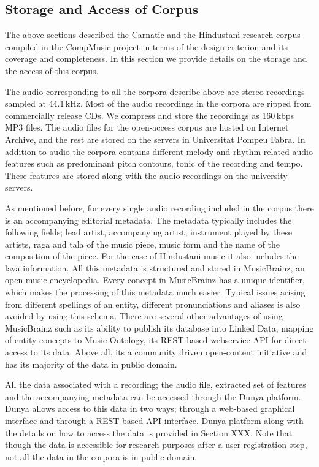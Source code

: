 \subsection{Storage and Access of Corpus}
\label{sec:corpus_storage_and_access}

The above sections described the Carnatic and the Hindustani research corpus compiled in the CompMusic project in terms of the design criterion and its coverage and completeness. In this section we provide details on the storage and the access of this corpus.

The audio corresponding to all the corpora describe above are stereo recordings sampled at 44.1\,kHz. Most of the audio recordings in the corpora are ripped from commercially release CDs. We compress and store the recordings as 160\,kbps MP3 files. The audio files for the open-access corpus are hosted on Internet Archive, and the rest are stored on the servers in Universitat Pompeu Fabra. In addition to audio the corpora contains different melody and rhythm related audio features such as predominant pitch contours, tonic of the recording and tempo. These features are stored along with the audio recordings on the university servers.

As mentioned before, for every single audio recording included in the corpus there is an accompanying editorial metadata. The metadata typically includes the following fields; lead artist, accompanying artist, instrument played by these artists, \gls{raga} and \gls{tala} of the music piece, music form and the name of the composition of the piece. For the case of Hindustani music it also includes the \gls{laya} information. All this metadata is structured and stored in MusicBrainz, an open music encyclopedia. Every concept in MusicBrainz has a unique identifier, which makes the processing of this metadata much easier. Typical issues arising from different spellings of an entity, different pronunciations and aliases is also avoided by using this schema. There are several other advantages of using MusicBrainz such as its ability to publish its database into Linked Data, mapping of entity concepts to Music Ontology, its REST-based webservice API for direct access to its data. Above all, its a community driven open-content initiative and has its majority of the data in public domain.

All the data associated with a recording; the audio file, extracted set of features and the accompanying metadata can be accessed through the Dunya platform. Dunya allows access to this data in two ways; through a web-based graphical interface and through a REST-based API interface. Dunya platform along with the details on how to access the data is provided in Section XXX. Note that though the data is accessible for research purposes after a user registration step, not all the data in the corpora is in public domain. 


